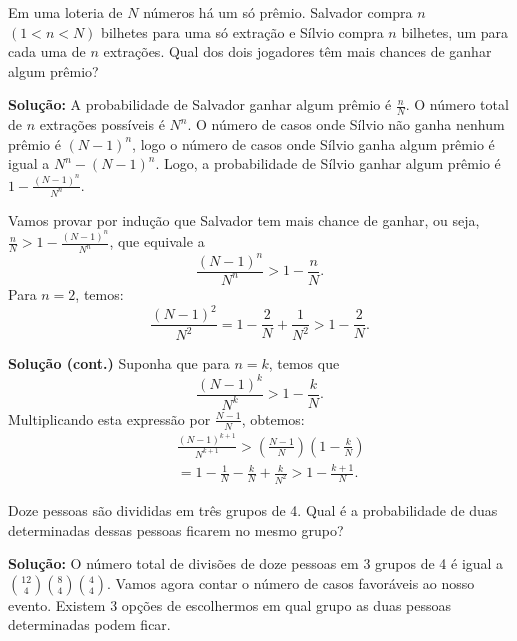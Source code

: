 \begin{frame}
\begin{exem}
Em uma loteria de $N$ números há um só prêmio. Salvador compra $n$
$(1<n<N)$ bilhetes para uma só extração e Sílvio compra $n$
bilhetes, um para cada uma de $n$ extrações. Qual dos dois jogadores
têm mais chances de ganhar algum prêmio?
\end{exem}

{\bf Solução:} A probabilidade de Salvador ganhar algum prêmio é
$\frac{n}{N}$. O número total de $n$ extrações possíveis é $N^n$. O
número de casos onde Sílvio não ganha nenhum prêmio é $(N-1)^n$,
logo o número de casos onde Sílvio ganha algum prêmio é igual a
$N^n-(N-1)^n$. Logo, a probabilidade de Sílvio ganhar algum prêmio é
$1-\frac{(N-1)^n}{N^n}$.

Vamos provar por indução que Salvador tem mais chance de ganhar, ou
seja, $\frac{n}{N}>1-\frac{(N-1)^n}{N^n}$, que equivale a
$$\frac{(N-1)^n}{N^n}>1-\frac{n}{N}.$$
Para $n=2$, temos:
$$\frac{(N-1)^2}{N^2}=1-\frac{2}{N}+\frac{1}{N^2}>1-\frac{2}{N}.$$
\end{frame}

\begin{frame}

{\bf Solução (cont.)} Suponha que para $n=k$, temos que
$$\frac{(N-1)^k}{N^k}>1-\frac{k}{N}.$$
Multiplicando esta expressão por $\frac{N-1}{N}$, obtemos:
\begin{eqnarray}
& & \frac{(N-1)^{k+1}}{N^{k+1}}>(\frac{N-1}{N})(1-\frac{k}{N})\nonumber\\
& & =1-\frac{1}{N}-\frac{k}{N}+\frac{k}{N^2}>1-\frac{k+1}{N}.\nonumber
\end{eqnarray}


\begin{exem}
Doze pessoas são divididas em três grupos de 4. Qual é a
probabilidade de duas determinadas dessas pessoas ficarem no mesmo
grupo?
\end{exem}

{\bf Solução: } O número total de divisões de doze pessoas em 3
grupos de 4 é igual a $\binom{12}{4}\binom{8}{4}\binom{4}{4}$. Vamos
agora contar o número de casos favoráveis ao nosso evento. Existem 3 opções de escolhermos em qual grupo as duas pessoas determinadas
podem ficar. 
\end{frame}

